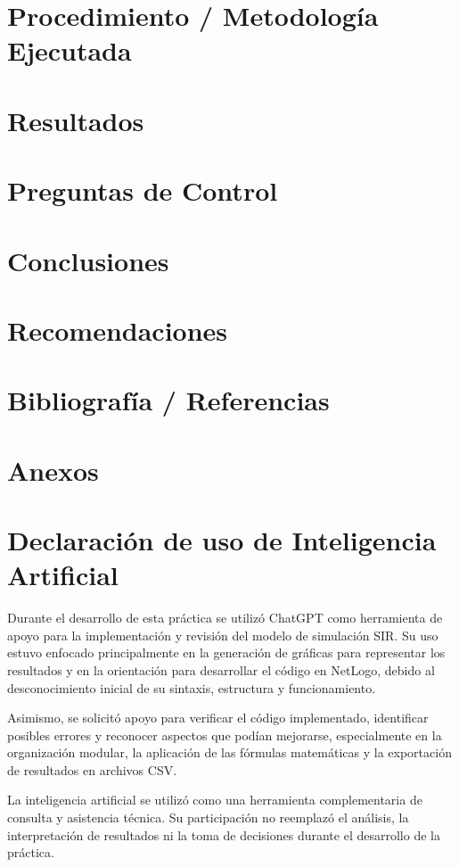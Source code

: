 \documentclass[11pt,a4paper]{article}
\begin{document}
\section{Procedimiento / Metodología Ejecutada}


\section{Resultados}

\section{Preguntas de Control}

\section{Conclusiones}


\section{Recomendaciones}


\section{Bibliografía / Referencias}

\section{Anexos}

\section{Declaración de uso de Inteligencia Artificial}

Durante el desarrollo de esta práctica se utilizó ChatGPT como herramienta de apoyo para la implementación y revisión del modelo de simulación SIR. Su uso estuvo enfocado principalmente en la generación de gráficas para representar los resultados y en la orientación para desarrollar el código en NetLogo, debido al desconocimiento inicial de su sintaxis, estructura y funcionamiento.

Asimismo, se solicitó apoyo para verificar el código implementado, identificar posibles errores y reconocer aspectos que podían mejorarse, especialmente en la organización modular, la aplicación de las fórmulas matemáticas y la exportación de resultados en archivos CSV.

La inteligencia artificial se utilizó como una herramienta complementaria de consulta y asistencia técnica. Su participación no reemplazó el análisis, la interpretación de resultados ni la toma de decisiones durante el desarrollo de la práctica.
\end{document}
